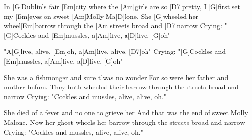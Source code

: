 

\begin{guitar}
	In [G]Dublin's fair [Em]city where the [Am]girls are so [D7]pretty,
	I [G]first set my [Em]eyes on sweet [Am]Molly Ma[D]lone.
	She [G]wheeled her wheel[Em]barrow through the [Am]streets broad and [D7]narrow
	Crying: "[G]Cockles and [Em]mussles, a[Am]live, a[D]live, [G]oh"
	
	\begin{highlightbar}
		"A[G]live, alive, [Em]oh, a[Am]live, alive, [D7]oh"
		Crying: "[G]Cockles and [Em]mussles, a[Am]live, a[D]live, [G]oh"
	\end{highlightbar}
	
	\songsection{Verse 2}
	She was a fishmonger and sure t'was no wonder
	For so were her father and mother before.
	They both wheeled their barrow through the streets broad and narrow
	Crying: "Cockles and mussles, alive, alive, oh."
	
	\begin{highlightbar}
		 \songsnippet{"Alive, alive, oh, alive, alive, oh" ...}
	\end{highlightbar}
	
	\songsection{Verse 3}
	She died of a fever and no one to grieve her
	And that was the end of sweet Molly Malone.
	Now her ghost wheels her barrow through the streets broad and narrow
	Crying: "Cockles and mussles, alive, alive, oh."
	
	\begin{highlightbar}
		  \optionalChord{(x2)}
	\end{highlightbar}
\end{guitar}

\vspace{-1.5em}



